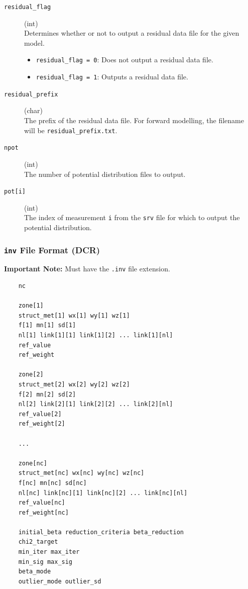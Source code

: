 \documentclass[a4paper,12pt]{article}
\begin{document}
\begin{description}
    \item[\texttt{residual\_flag}] (int)\hfill \\
    Determines whether or not to output a residual data file for the given model.
    \begin{itemize}
        \item \texttt{residual\_flag = 0}: Does not output a residual data file.
        \item \texttt{residual\_flag = 1}: Outputs a residual data file.
    \end{itemize}
    
    \item[\texttt{residual\_prefix}] (char)\hfill \\
    The prefix of the residual data file. For forward modelling, the filename will be \texttt{residual\_prefix.txt}.
    
    \item[\texttt{npot}] (int)\hfill \\
    The number of potential distribution files to output.

    \item[\texttt{pot[i]}] (int)\hfill \\
    The index of measurement \texttt{i} from the \texttt{srv} file for which to output the potential distribution.
\end{description}



\subsubsection{\texttt{inv} File Format (DCR)} \label{inversion_dc}

\begin{framed}
\noindent \textbf{Important Note:} Must have the \texttt{.inv} file extension.
\end{framed}

\begin{framed}
\begin{verbatim}
    nc

    zone[1]
    struct_met[1] wx[1] wy[1] wz[1]
    f[1] mn[1] sd[1]
    nl[1] link[1][1] link[1][2] ... link[1][nl]
    ref_value
    ref_weight

    zone[2]
    struct_met[2] wx[2] wy[2] wz[2]
    f[2] mn[2] sd[2]
    nl[2] link[2][1] link[2][2] ... link[2][nl]
    ref_value[2]
    ref_weight[2]

    ...

    zone[nc]
    struct_met[nc] wx[nc] wy[nc] wz[nc]
    f[nc] mn[nc] sd[nc]
    nl[nc] link[nc][1] link[nc][2] ... link[nc][nl]
    ref_value[nc]
    ref_weight[nc]

    initial_beta reduction_criteria beta_reduction
    chi2_target
    min_iter max_iter
    min_sig max_sig
    beta_mode
    outlier_mode outlier_sd
\end{verbatim}
\end{framed}
\end{document}
